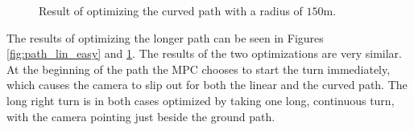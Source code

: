 \begin{figure}
	\caption{Result of optimizing the curved path with a radius of $150$m.}
	\label{fig:path_cur_easy}
\end{figure}

The results of optimizing the longer path can be seen in Figures \ref{fig:path_lin_easy} and \ref{fig:path_cur_easy}. The results of the two optimizations are very similar. At the beginning of the path the MPC chooses to start the turn immediately, which causes the camera to slip out for both the linear and the curved path. The long right turn is in both cases optimized by taking one long, continuous turn, with the camera pointing just beside the ground path.

